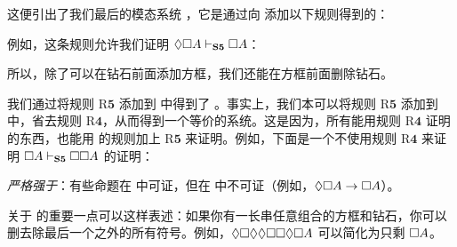 这便引出了我们最后的模态系统 \mlSfive，它是通过向 \mlSfour{} 添加以下规则得到的：

例如，这条规则允许我们证明 $\Diamond\Box A\vdash_{\mathbf{S5}}  \Box A$：

\begin{fitchproof}
	\PR
	\open
	\AS
	\open
	\AS
	\close
	\close
\end{fitchproof}

所以，除了可以在钻石前面添加方框，我们还能在方框前面删除钻石。

我们通过将规则 R$\mathbf{5}$ 添加到 \mlSfour{} 中得到了 \mlSfive{}。事实上，我们本可以将规则 R$\mathbf{5}$ 添加到 \mlT{} 中，省去规则 R$\mathbf{4}$，从而得到一个等价的系统。这是因为，所有能用规则 R$\mathbf{4}$ 证明的东西，也能用 \mlT{} 的规则加上 R$\mathbf{5}$ 来证明。例如，下面是一个不使用规则 R$\mathbf{4}$ 来证明 $\Box A \vdash_{\mathbf{S5}} \Box\Box A$ 的证明：

\begin{fitchproof}
	\PR
	\open
	\AS
	\close
	\open
	\AS
	\open
	\AS
	\open
	\AS
	\close
	\close
	\close
\end{fitchproof}

\mlSfive{}\emph{严格强于}\mlSfour{}：有些命题在 \mlSfive{} 中可证，但在 \mlSfour{} 中不可证（例如，$\Diamond\Box A \rightarrow \Box A$）。

关于 \mlSfive{} 的重要一点可以这样表述：如果你有一长串任意组合的方框和钻石，你可以删去除最后一个之外的所有符号。例如，$\Diamond\Box\Diamond\Diamond\Box\Box\Diamond\Box A$ 可以简化为只剩 $\Box A$。

